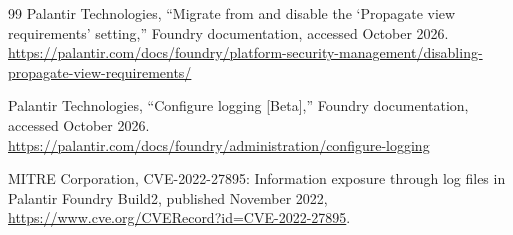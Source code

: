 \documentclass[11pt]{article}
\theoremstyle{plain}
\theoremstyle{definition}
\theoremstyle{remark}
\begin{document}
\begin{thebibliography}{99}
 Palantir Technologies, ``Migrate from and disable the `Propagate view requirements' setting,'' Foundry documentation, accessed October 2026. \url{https://palantir.com/docs/foundry/platform-security-management/disabling-propagate-view-requirements/}

 Palantir Technologies, ``Configure logging [Beta],'' Foundry documentation, accessed October 2026. \url{https://palantir.com/docs/foundry/administration/configure-logging}

 MITRE Corporation, CVE-2022-27895: Information exposure through log files in Palantir Foundry Build2, published November 2022, \url{https://www.cve.org/CVERecord?id=CVE-2022-27895}.

\end{thebibliography}
\end{document}
